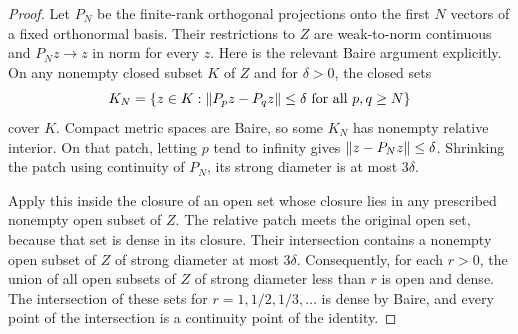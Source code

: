 \begin{proof}
Let $P_N$ be the finite-rank orthogonal projections onto the first
$N$ vectors of a fixed orthonormal basis. Their restrictions to $Z$
are weak-to-norm continuous and $P_Nz\to z$ in norm for every
$z$. Here is the relevant Baire argument explicitly. On any
nonempty closed subset $K$ of $Z$ and for $\delta>0$, the closed
sets
\[
 K_N=\{z\in K:\left\lVert P_pz-P_qz\right\rVert\leq\delta
                    \text{ for all }p,q\geq N\}
\]
cover $K$. Compact metric spaces are Baire, so some $K_N$ has
nonempty relative interior. On that patch, letting $p$ tend to
infinity gives $\left\lVert z-P_Nz\right\rVert\leq\delta$. Shrinking the patch
using continuity of $P_N$, its strong diameter is at most
$3\delta$.

Apply this inside the closure of an open set whose closure lies
in any prescribed nonempty open subset of $Z$. The relative patch
meets the original open set, because that set is dense in its
closure. Their intersection contains a nonempty open subset of $Z$
of strong diameter at most $3\delta$. Consequently, for each
$r>0$, the union of all open subsets of $Z$ of strong diameter
less than $r$ is open and dense. The intersection of these sets
for $r=1,1/2,1/3,\ldots$ is dense by Baire, and every point of
the intersection is a continuity point of the identity.
\end{proof}


